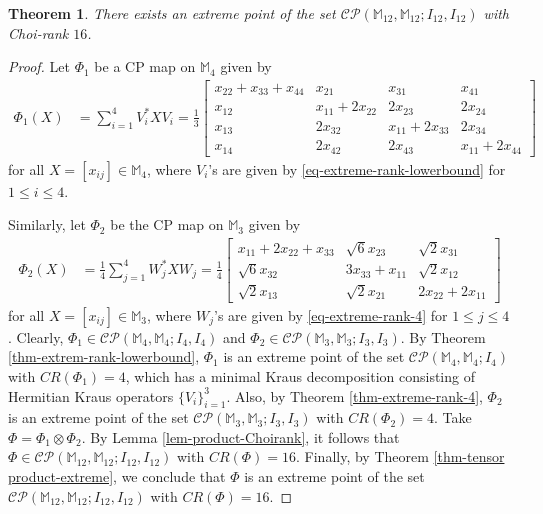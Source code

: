 \documentclass[10pt,reqno]{amsart}
\theoremstyle{definition}
\theoremstyle{plain}
\newtheorem{thm}[defn]{Theorem}
\theoremstyle{remark}
\newcommand{\mbb}[1]{\mathbb{#1}}
\newcommand{\msc}[1]{\mathscr{#1}}
\newcommand{\M}[1]{\mbb{M}_{#1}}%
\numberwithin{equation}{section}%
\begin{document}
\begin{thm}\label{thm-CR-16 in 12}
	There exists an extreme point of the set $\msc{CP}(\M{12},\M{12};I_{12},I_{12})$ with Choi-rank $16$.
\end{thm}


\begin{proof}
	Let $\Phi_1$ be a CP map on $\M{4}$ given by 
	\begin{align*}
		\Phi_1(X) &=\sum_{i=1}^4V_i^*XV_i= \frac{1}{3}\begin{bmatrix}
			x_{22}+x_{33}+x_{44} & x_{21} & x_{31} & x_{41}\\
			x_{12} & x_{11}+2x_{22} & 2x_{23} & 2x_{24}\\
			x_{13} & 2x_{32} & x_{11}+2x_{33} & 2x_{34}\\
			x_{14} & 2x_{42} & 2x_{43} & x_{11}+2x_{44}
		\end{bmatrix}
	\end{align*}
	for all $X=[x_{ij}]\in\M{4}$, where $V_i$'s are given by \eqref{eq-extreme-rank-lowerbound} for $1\leq i\leq 4$.
	
	Similarly, let $\Phi_2$ be the CP map on $\M{3}$ given by 
	\begin{align*}
		\Phi_2(X) &= \frac{1}{4}\sum_{j=1}^4 W_j^* X W_j = \frac{1}{4}\begin{bmatrix}
			x_{11} + 2x_{22} + x_{33} & \sqrt{6}x_{23} & \sqrt{2}x_{31} \\
			\sqrt{6}x_{32} & 3x_{33} + x_{11} & \sqrt{2}x_{12} \\
			\sqrt{2}x_{13} & \sqrt{2}x_{21} & 2x_{22} + 2x_{11}
		\end{bmatrix}
	\end{align*}
	for all $X=[x_{ij}]\in\M{3}$, where $W_j$'s are given by \eqref{eq-extreme-rank-4} for $1\leq j\leq 4$. Clearly, $\Phi_1\in\msc{CP}(\M{4},\M{4};I_{4},I_{4})$ and $\Phi_2\in\msc{CP}(\M{3},\M{3}; I_{3},I_{3})$. By Theorem \ref{thm-extrem-rank-lowerbound}, $\Phi_1$ is an extreme point of the set $\msc{CP}(\M{4},\M{4}; I_{4})$ with $CR(\Phi_1)=4$, which has a minimal Kraus decomposition consisting of Hermitian Kraus operators $\{V_i\}_{i=1}^3$. Also, by Theorem \ref{thm-extreme-rank-4}, $\Phi_2$ is an extreme point of the set $\msc{CP}(\M{3},\M{3}; I_{3}, I_{3})$ with $CR(\Phi_2)=4$. Take $\Phi = \Phi_1 \otimes \Phi_2$. By Lemma \ref{lem-product-Choirank}, it follows that $\Phi\in\msc{CP}(\M{12},\M{12}; I_{12}, I_{12})$ with $CR(\Phi)=16$. Finally, by Theorem \ref{thm-tensor product-extreme}, we conclude that $\Phi$ is an extreme point of the set $\msc{CP}(\M{12},\M{12}; I_{12}, I_{12})$ with $CR(\Phi)=16$.
\end{proof}
\end{document}
